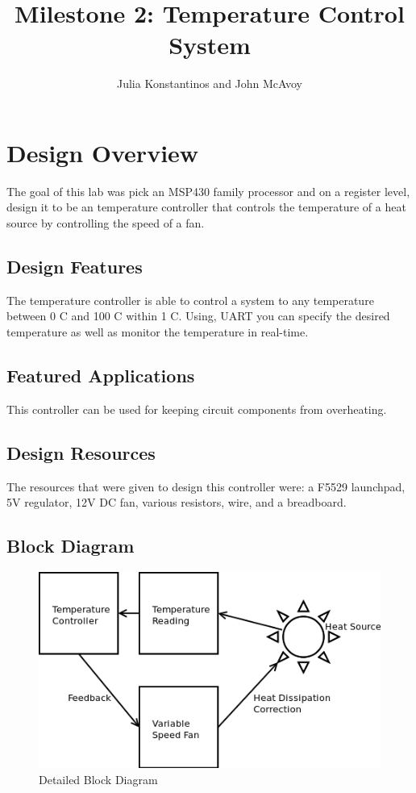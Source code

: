 \documentclass{hitec}
\title{Milestone 2: Temperature Control System}
\author{Julia Konstantinos and John McAvoy}
\begin{document}
\maketitle
\tableofcontents

\section{Design Overview}
The goal of this lab was pick an MSP430 family processor and on a register
level, design it to be an temperature controller that controls the temperature
of a heat source by controlling the speed of a fan.

\subsection{Design Features}
The temperature controller is able to control a system to any temperature
between 0 \degree C and 100 \degree C within 1 \degree C. Using, UART you can
specify the desired temperature as well as monitor the temperature in real-time.

\subsection{Featured Applications}
This controller can be used for keeping circuit components from overheating.

\subsection{Design Resources}
The resources that were given to design this controller were: a F5529 launchpad,
5V regulator, 12V DC fan, various resistors, wire, and a breadboard.

\subsection{Block Diagram}
\begin{figure}[H]
    \centering
    \includegraphics[scale=0.9]{block_diagram}
    \caption{Detailed Block Diagram}
    \label{fig:block_diagram}
\end{figure}
\end{document}
